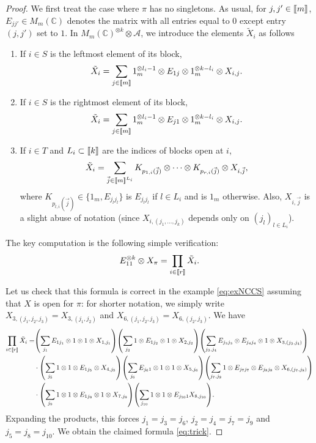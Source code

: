 \documentclass[11pt]{article}
\newcommand{\cA}{\mathcal{A}}
\newcommand{\dC}{\mathbb {C}}
\newcommand{\PAR}[1]{{{\left(#1\right)}}} %
\newcommand{\1}{1\!\!{\sf I}}
\newcommand{\INT}[1]{{{\left[\hspace{-1.4pt}\left[#1\right]\hspace{-1.4pt}\right]}}}
\begin{document}
\begin{proof}
We first treat the case where $\pi$ has no singletons.
As usual, for $j,j' \in \INT{m}$, $E_{jj'} \in M_m(\dC)$ denotes the matrix with all entries equal to $0$ except entry $(j,j')$ set to $1$. In $M_m(\mathbb{C})^{\otimes k}\otimes \cA$, we introduce the  elements
$\tilde{X}_i$ as follows
\begin{enumerate}
\item If $i \in S$ is the leftmost element of its block, 
$$\tilde{X}_i=\sum_{j\in \INT{m}} 1_m^{\otimes l_i-1}\otimes E_{1j}\otimes 1_m^{\otimes k-l_i}\otimes X_{i,j}.$$
\item If $i \in S$ is the rightmost element of its block, 
$$\tilde{X}_i=\sum_{j\in \INT{m}} 1_m^{\otimes l_i-1}\otimes E_{j1}\otimes 1_m^{\otimes k-l_i}\otimes X_{i,j}.$$
\item If $i\in T$ and $L_i \subset \INT{k}$ are the indices of blocks open at $i$,
$$\tilde{X}_i=\sum_{\vec  j\in \INT{m}^{L_i}} K_{p_{1,i}(\vec j)} \otimes \cdots \otimes K_{p_{r,i}(\vec j)} \otimes X_{i,\vec j},$$
where $K_{p_{l,i} (\vec j)} \in \{ 1_m, E_{j_l j_l} \}$ is $E_{j_l j_l}$ if $l \in L_i$ and is $1_m$ otherwise. Also, $X_{i,\vec j}$ is a slight abuse of notation (since $X_{i,(j_1,\ldots,j_k)}$ depends only on $(j_{l})_{l \in L_i}$).
\end{enumerate}

The key computation is the following simple verification: 
\begin{equation}\label{eq:trick}
E_{11}^{\otimes k}\otimes X_{\pi}=\prod_{i\in \INT{r}}\tilde{X}_i.
\end{equation}

Let us check that this formula is correct in the example \eqref{eq:exNCCS} assuming that $X$ is open for $\pi$: for shorter notation, we simply write $X_{3,(j_1,j_2,j_3)} = X_{3,(j_1,j_2)}$ and $X_{6,(j_1,j_2,j_3)} = X_{6,(j_2,j_3)}$. We have 
{\small \begin{align*}
\prod_{i\in \INT{r}}\tilde{X}_i  = & \PAR{ \sum_{j_1} E_{1j_1} \otimes 1 \otimes 1 \otimes X_{1,j_1}   }\PAR{ \sum_{j_2} 1 \otimes E_{1 j_2} \otimes 1 \otimes X_{2,j_2}  } \PAR{ \sum_{j_3,j_4} E_{j_3 j_3} \otimes E_{j_4 j_4} \otimes 1 \otimes X_{3,(j_3,j_4)}  } \\
&  \cdot  \PAR{ \sum_{j_5} 1  \otimes 1 \otimes E_{1 j_5} \otimes X_{4,j_5}  }  \PAR{ \sum_{j_6} E_{j_61} \otimes 1 \otimes 1  \otimes X_{5,j_6}  }\PAR{ \sum_{j_7,j_8} 1 \otimes E_{j_7 j_7} \otimes E_{j_8 j_8} \otimes X_{6,(j_7,j_8)}  } \\
& \cdot  \PAR{ \sum_{j_9} 1  \otimes 1 \otimes E_{1 j_9}\otimes 1 \otimes X_{7,j_{9}}  }  \PAR{ \sum_{j_{10}} 1 \otimes 1 \otimes E_{j_{10} 1} X_{8,j_{10}}  }.
\end{align*}}
Expanding the products, this forces $j_1 = j_3 = j_6$, $j_2 = j_4 = j_7 = j_9$ and $j_5 = j_8 = j_{10}$. We obtain the claimed formula \eqref{eq:trick}. 



\end{proof}
\end{document}
